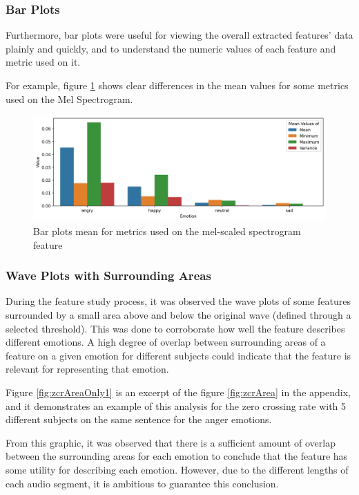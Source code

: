 \subsubsection{Bar Plots}

Furthermore, bar plots were useful for viewing the overall extracted features' data plainly and quickly, and to understand the numeric values of each feature and metric used on it.

For example, figure \ref{fig:melBarPlot} shows clear differences in the mean values for some metrics used on the Mel Spectrogram.

\begin{figure}[H]
	\centering
	\includegraphics[width=\textwidth]{figs/4_1_traditional/meanFeatBarPlot.png}
	\caption{Bar plots mean for metrics used on the mel-scaled spectrogram feature}
	\label{fig:melBarPlot}
\end{figure}


\subsubsection{Wave Plots with Surrounding Areas}

During the feature study process, it was observed the wave plots of some features surrounded by a small area above and below the original wave (defined through a selected threshold). This was done to corroborate how well the feature describes different emotions. A high degree of overlap between surrounding areas of a feature on a given emotion for different subjects could indicate that the feature is relevant for representing that emotion.

Figure \ref{fig:zcrAreaOnly1} is an excerpt of the figure \ref{fig:zcrArea} in the appendix, and it demonstrates an example of this analysis for the zero crossing rate with 5 different subjects on the same sentence for the anger emotions.

From this graphic, it was observed that there is a sufficient amount of overlap between the surrounding areas for each emotion to conclude that the feature has some utility for describing each emotion. However, due to the different lengths of each audio segment, it is ambitious to guarantee this conclusion.

